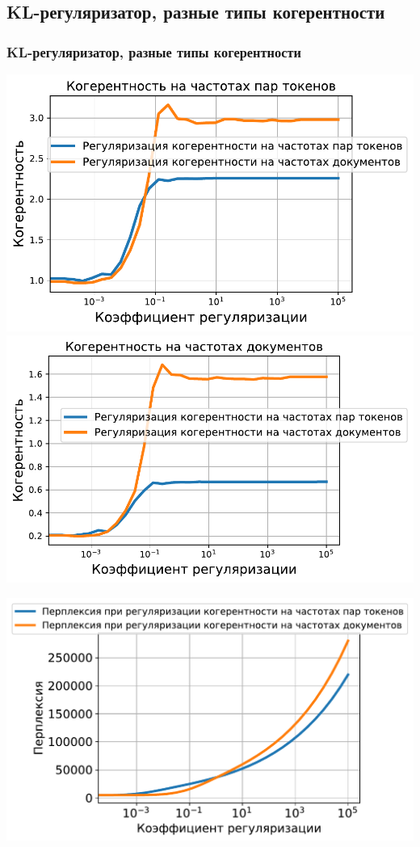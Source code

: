 \documentclass[unicode]{beamer}
\begin{document}
\subsection{KL-регуляризатор, разные типы когерентности}
\begin{frame}
\frametitle{KL-регуляризатор, разные типы когерентности}

\begin{center}
    \includegraphics[scale=0.35]{coherence_tf_score_reg_on_ppmi_tf_df_nytimes.pdf}
    \includegraphics[scale=0.35]{coherence_df_score_reg_on_ppmi_tf_df_nytimes.pdf}
\end{center}

\begin{center}
\includegraphics[scale=0.35]{perplexity_tf_df_on_ppmi_nytimes.pdf}
\end{center}
\end{frame}
\end{document}
